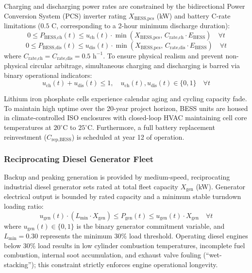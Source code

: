 \documentclass[11pt,a4paper]{article}
\begin{document}
Charging and discharging power rates are constrained by the bidirectional Power Conversion System (PCS) inverter rating $X_{\text{BESS,pcs}}$ (kW) and battery C-rate limitations ($0.5\text{ C}$, corresponding to a 2-hour minimum discharge duration):
\begin{equation}
    0 \le P_{\text{BESS,ch}}(t) \le u_{\text{ch}}(t) \cdot \min\left( X_{\text{BESS,pcs}}, \, C_{\text{rate,ch}} \cdot E_{\text{BESS}} \right) \quad \forall t
    \label{eq:ch_rate}
\end{equation}
\begin{equation}
    0 \le P_{\text{BESS,dis}}(t) \le u_{\text{dis}}(t) \cdot \min\left( X_{\text{BESS,pcs}}, \, C_{\text{rate,dis}} \cdot E_{\text{BESS}} \right) \quad \forall t
    \label{eq:dis_rate}
\end{equation}
where $C_{\text{rate,ch}} = C_{\text{rate,dis}} = 0.5\text{ h}^{-1}$. To ensure physical realism and prevent non-physical circular arbitrage, simultaneous charging and discharging is barred via binary operational indicators:
\begin{equation}
    u_{\text{ch}}(t) + u_{\text{dis}}(t) \le 1, \quad u_{\text{ch}}(t), u_{\text{dis}}(t) \in \{0, 1\} \quad \forall t
    \label{eq:mutual_exclusive}
\end{equation}

Lithium iron phosphate cells experience calendar aging and cycling capacity fade. To maintain high uptime over the 20-year project horizon, BESS units are housed in climate-controlled ISO enclosures with closed-loop HVAC maintaining cell core temperatures at $20^\circ\text{C}$ to $25^\circ\text{C}$. Furthermore, a full battery replacement reinvestment ($C_{\text{rep,BESS}}$) is scheduled at year 12 of operation.

\subsubsection{Reciprocating Diesel Generator Fleet}
Backup and peaking generation is provided by medium-speed, reciprocating industrial diesel generator sets rated at total fleet capacity $X_{\text{gen}}$ (kW). Generator electrical output is bounded by rated capacity and a minimum stable turndown loading ratio:
\begin{equation}
    u_{\text{gen}}(t) \cdot \left( L_{\min} \cdot X_{\text{gen}} \right) \le P_{\text{gen}}(t) \le u_{\text{gen}}(t) \cdot X_{\text{gen}} \quad \forall t
    \label{eq:gen_bounds}
\end{equation}
where $u_{\text{gen}}(t) \in \{0, 1\}$ is the binary generator commitment variable, and $L_{\min} = 0.30$ represents the minimum 30\% load threshold. Operating diesel engines below 30\% load results in low cylinder combustion temperatures, incomplete fuel combustion, internal soot accumulation, and exhaust valve fouling (``wet-stacking''); this constraint strictly enforces engine operational longevity.
\end{document}
